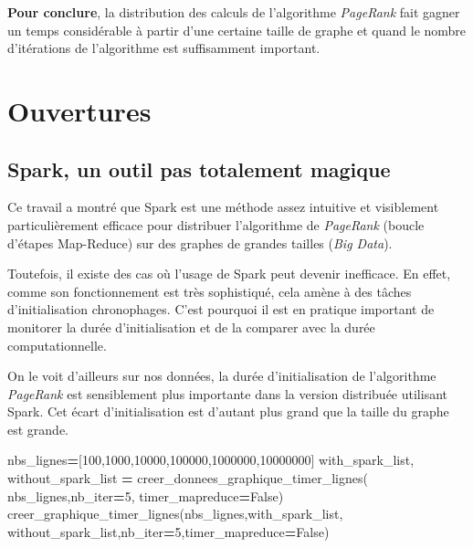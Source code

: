 \documentclass[10pt,a4paper]{article}
\newenvironment{Shaded}{\begin{snugshade}}{\end{snugshade}}
\newcommand{\DecValTok}[1]{\textcolor[rgb]{0.00,0.00,0.81}{#1}}
\newcommand{\NormalTok}[1]{#1}
\newcommand{\OperatorTok}[1]{\textcolor[rgb]{0.81,0.36,0.00}{\textbf{#1}}}
\newcommand{\VariableTok}[1]{\textcolor[rgb]{0.00,0.00,0.00}{#1}}
\theoremstyle{break}
\begin{document}
\textbf{Pour conclure}, la distribution des calculs de l'algorithme \emph{PageRank} fait gagner un temps considérable à partir d'une certaine taille de graphe et quand le nombre d'itérations de l'algorithme est suffisamment important.

\hypertarget{ouvertures}{%
\section{Ouvertures}\label{ouvertures}}

\hypertarget{spark-un-outil-pas-totalement-magique}{%
\subsection{Spark, un outil pas totalement magique}\label{spark-un-outil-pas-totalement-magique}}

Ce travail a montré que Spark est une méthode assez intuitive et visiblement particulièrement efficace pour distribuer l'algorithme de \emph{PageRank} (boucle d'étapes Map-Reduce) sur des graphes de grandes tailles (\emph{Big Data}).

Toutefois, il existe des cas où l'usage de Spark peut devenir inefficace. En effet, comme son fonctionnement est très sophistiqué, cela amène à des tâches d'initialisation chronophages. C'est pourquoi il est en pratique important de monitorer la durée d'initialisation et de la comparer avec la durée computationnelle.

On le voit d'ailleurs sur nos données, la durée d'initialisation de l'algorithme \emph{PageRank} est sensiblement plus importante dans la version distribuée utilisant Spark. Cet écart d'initialisation est d'autant plus grand que la taille du graphe est grande.

\begin{Shaded}
\begin{Highlighting}[]
\NormalTok{nbs_lignes}\OperatorTok{=}\NormalTok{[}\DecValTok{100}\NormalTok{,}\DecValTok{1000}\NormalTok{,}\DecValTok{10000}\NormalTok{,}\DecValTok{100000}\NormalTok{,}\DecValTok{1000000}\NormalTok{,}\DecValTok{10000000}\NormalTok{]}
\NormalTok{with_spark_list, without_spark_list }\OperatorTok{=}\NormalTok{ creer_donnees_graphique_timer_lignes(}
\NormalTok{    nbs_lignes,nb_iter}\OperatorTok{=}\DecValTok{5}\NormalTok{, timer_mapreduce}\OperatorTok{=}\VariableTok{False}\NormalTok{)}
\NormalTok{creer_graphique_timer_lignes(nbs_lignes,with_spark_list,}
\NormalTok{                             without_spark_list,nb_iter}\OperatorTok{=}\DecValTok{5}\NormalTok{,timer_mapreduce}\OperatorTok{=}\VariableTok{False}\NormalTok{)}
\end{Highlighting}
\end{Shaded}
\end{document}
